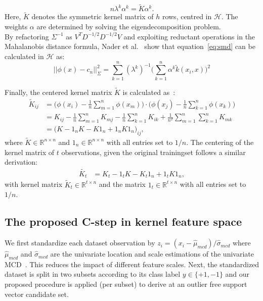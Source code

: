 \documentclass[preprint,12pt]{elsarticle}
\begin{document}
	\begin{equation}
	n \lambda^k \alpha^k = \tilde{K} \alpha^k.
	\end{equation}
	Here, $\tilde{K}$ denotes the symmetric kernel matrix of $h$ rows, centred in $\mathcal{H}$. The weights $\alpha$ are determined by solving the eigendecomposition problem. \\
	By refactoring $\Sigma^{-1}$ as $V^T D^{-1/2} D^{-1/2} V$ and exploiting reductant operations in the Mahalanobis distance formula, Nader et al.~\cite{nader2014mahalanobis} show that equation~\eqref{eq:smd} can be calculated in $\mathcal{H}$ as:
	\begin{equation}
	\label{eq:Mahal}
	||\phi(x) - c_n||^2_{\Sigma} = \sum_{k=1}^{n} (\lambda^k)^{-1} \big( \sum_{k=1}^{n} \alpha^k \tilde{k}(x_i, x) \big)^2
	\end{equation}	
	
	Finally, the centered kernel matrix $\tilde{K}$ is calculated as~\cite{scholkopf1998nonlinear}:
	\begin{align}
	\label{eq:centerKh}
	\tilde{K}_{ij} &= \Big(\phi(x_i) - \frac{1}{n}\sum_{m=1}^n\phi(x_m)\Big) \cdot \Big(\phi(x_j) - \frac{1}{n}\sum_{k=1}^n\phi(x_k)\Big) \\
	&= K_{ij} - \frac{1}{n}\sum_{m=1}^n K_{mj} - \frac{1}{n}\sum_{k=1}^n K_{ik} + \frac{1}{n^2}\sum_{m=1}^n\sum_{k=1}^n K_{mk} \\
	&= \Big(K - 1_n K - K1_n + 1_n K1_n\Big)_{ij},
	\end{align}
	where $ \tilde{K} \in \mathbb{R}^{n \times n}$ and $1_n \in \mathbb{R}^{n\times n}$ with all entries set to $1/n$. 
	The centering of the kernel matrix of $t$ observations, given the original trainingset follows a similar derivation:
	\begin{align}
	\label{eq:centerKt}
	\tilde{K_t} &= K_t - 1_t K - K_t 1_n + 1_t K1_n,
	\end{align}
	with kernel matrix $ \tilde{K}_t \in \mathbb{R}^{t \times n}$ and the matrix $1_t \in \mathbb{R}^{t \times n}$ with all entries set to $1/n$.
	
	\subsection{The proposed C-step in kernel feature space}
	
	We first standardize each dataset observation by $z_i = (x_i - \hat{\mu}_{mcd}) / \hat{\sigma}_{mcd}$ where $\hat{\mu}_{mcd}$ and $\hat{\sigma}_{mcd}$ are the univariate location and scale estimations of the univariate MCD~\cite{rousseeuw1999fast}. This reduces the impact of different feature scales. Next, the standardized dataset is split in two subsets according to its class label $y \in \{+1, -1\}$ and our proposed  procedure is applied (per subset) to derive at an outlier free support vector candidate set. 
	
\end{document}

